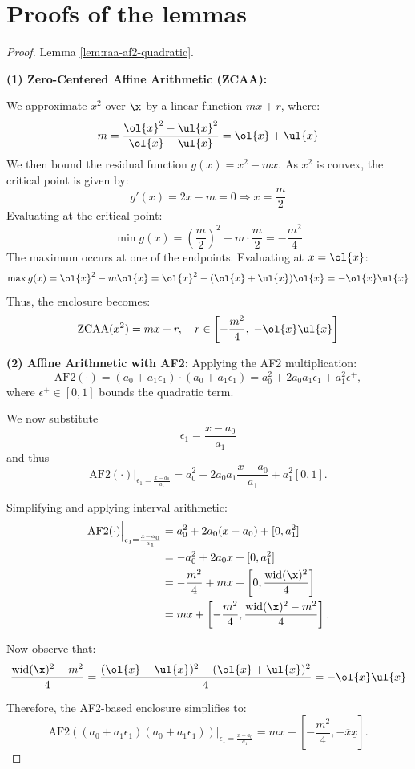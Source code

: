 \documentclass[10pt]{article}
\begin{document}
\section*{Proofs of the lemmas}
\begin{proof} Lemma \ref{lem:raa-af2-quadratic}.

\noindent
\textbf{(1) Zero-Centered Affine Arithmetic (ZCAA):}  

We approximate $x^2$ over $\x$ by a linear function $m x + r$, where:
\[
m = \frac{\ol{x}^2 - \ul{x}^2}{\ol{x} - \ul{x}} = \ol{x} + \ul{x}
\]
We then bound the residual function $g(x) = x^2 - m x$. 
As $x^2$ is convex, the critical point is given by:
\[
g'(x) = 2x - m = 0 \Rightarrow x = \frac{m}{2}
\]
Evaluating at the critical point:
\[
\min g(x) = \left( \frac{m}{2} \right)^2 - m \cdot \frac{m}{2} = -\frac{m^2}{4}
\]
The maximum occurs at one of the endpoints. Evaluating at $x = \ol{x}$:
\[
\max g(x) = \ol{x}^2 - m \ol{x} = \ol{x}^2 - (\ol{x} + \ul{x})\ol{x} = -\ol{x} \ul{x}
\]
Thus, the enclosure becomes:
\[
\mathrm{ZCAA}(x^2) = m x + r, \quad r \in \left[ -\frac{m^2}{4},\; -\ol{x}\ul{x} \right]
\]

\bigskip

\noindent
\textbf{(2) Affine Arithmetic with AF2:}  
Applying the AF2 multiplication:
\[
\mathrm{AF2}(\cdot) = (a_0 + a_1 \epsilon_1)\cdot(a_0 + a_1 \epsilon_1) = a_0^2 + 2 a_0 a_1 \epsilon_1 + a_1^2 \epsilon^+,
\]
where \(\epsilon^+ \in [0, 1]\) bounds the quadratic term.

We now substitute
\[
\epsilon_1 = \frac{x - a_0}{a_1}
\]
and thus
\[
\mathrm{AF2}(\cdot)\Big|_{\epsilon_1 = \frac{x - a_0}{a_1}} = a_0^2 + 2 a_0 a_1 \frac{x - a_0}{a_1} + a_1^2 [0, 1].
\]

Simplifying and applying interval arithmetic:
\begin{align*}
\mathrm{AF2}(\cdot)\Big|_{\epsilon_1 = \frac{x - a_0}{a_1}}
&= a_0^2 + 2 a_0 (x - a_0) + [0,  a_1^2] \\
&= -a_0^2 + 2 a_0 x +  [0, a_1^2] \\
&= -\frac{m^2}{4} + m x + \left[0,\frac{\mathrm{wid}(\x)^2}{4}\right] \\
&= m x + \left[ -\frac{m^2}{4},\frac{\mathrm{wid}(\x)^2-m^2}{4}\right].
\end{align*}


Now observe that:
\[
\frac{\mathrm{wid}(\x)^2 - m^2}{4} = \frac{(\ol{x} - \ul{x})^2 - (\ol{x} + \ul{x})^2}{4} = -\ol{x} \ul{x}
\]

Therefore, the AF2-based enclosure simplifies to:
\[
\mathrm{AF2}((a_0 + a_1 \epsilon_1)(a_0 + a_1 \epsilon_1))\Big|_{\epsilon_1 = \frac{x - a_0}{a_1}} = m x + \left[-\frac{m^2}{4}, -\overline{x}\underline{x}\right].
\]
\end{proof}
\end{document}
